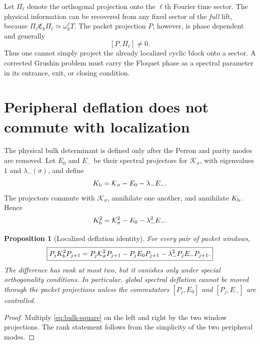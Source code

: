\documentclass[11pt]{article}
\newtheorem{proposition}[theorem]{Proposition}
\theoremstyle{definition}
\theoremstyle{remark}
\newcommand{\cK}{\mathcal K}
\begin{document}
Let $\Pi_\ell$ denote the orthogonal projection onto the $\ell$th Fourier
time sector.  The physical information can be recovered from any fixed
sector of the \emph{full} lift, because
$\Pi_\ell\mathfrak C_k\Pi_\ell\simeq\omega_k^\ell T$.  The packet projection
$P$, however, is phase dependent and generally
\begin{equation}\label{eq:sector-commutator}
 [P,\Pi_\ell]\ne0.
\end{equation}
Thus one cannot simply project the already localized cyclic block onto a
sector.  A corrected Grushin problem must carry the Floquet phase as a
spectral parameter in its entrance, exit, or closing condition.

\section{Peripheral deflation does not commute with localization}
\label{sec:deflation}

The physical bulk determinant is defined only after the Perron and parity
modes are removed.  Let $E_0$ and $E_-$ be their spectral projectors for
$\cK_\sigma$, with eigenvalues $1$ and $\lambda_-(\sigma)$, and define
\begin{equation}\label{eq:bulk-operator}
 K_{\rm b}
 =\cK_\sigma-E_0-\lambda_-E_-.
\end{equation}
The projectors commute with $\cK_\sigma$, annihilate one another, and
annihilate $K_{\rm b}$.  Hence
\begin{equation}\label{eq:bulk-square}
 K_{\rm b}^2
 =\cK_\sigma^2-E_0-\lambda_-^2E_-.
\end{equation}

\begin{proposition}[Localized deflation identity]
\label{prop:deflation-localization}
For every pair of packet windows,
\begin{equation}\label{eq:localized-deflation}
 \boxed{
 P_jK_{\rm b}^2P_{j+1}
 =P_j\cK_\sigma^2P_{j+1}
 -P_jE_0P_{j+1}
 -\lambda_-^2P_jE_-P_{j+1}.}
\end{equation}
The difference has rank at most two, but it vanishes only under special
orthogonality conditions.  In particular, global spectral deflation cannot
be moved through the packet projections unless the commutators
$[P_j,E_0]$ and $[P_j,E_-]$ are controlled.
\end{proposition}

\begin{proof}
Multiply \eqref{eq:bulk-square} on the left and right by the two window
projections.  The rank statement follows from the simplicity of the two
peripheral modes.
\end{proof}
\end{document}
